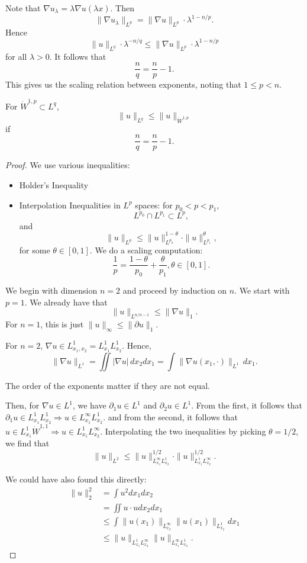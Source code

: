 \documentclass[12pt]{scrartcl}
\begin{document}
Note that $\nabla u_\lambda = \lambda \nabla u(\lambda x)$.  Then 
$$\|\nabla u_\lambda\|_{L^p} = \| \nabla u \|_{L^p} \cdot \lambda^{1 - n/p}.$$
Hence $$\|u\|_{L^q} \cdot \lambda^{-n/q} \le \|\nabla u\|_{L^p} \cdot \lambda^{1 - n/p}$$
for all $\lambda > 0$.  It follows that 
$$\frac{n}{q} = \frac{n}{p} - 1.$$
This gives us the scaling relation between exponents, noting that $1 \le p < n$.
\begin{thm}  For $\dot{W}^{1,p} \subset L^q$, 
$$\|u\|_{L^q} \le \| u \|_{\dot{W}^{1, p}}$$
if 
$$\frac{n}{q} = \frac{n}{p} - 1.$$
\end{thm}
\begin{proof}
We use various inequalities:
\begin{itemize}
\item Holder's Inequality
\item Interpolation Inequalities in $L^p$ spaces: for $p_0 < p < p_1$,
$$L^{p_0} \cap L^{p_1} \subset L^p,$$
and 
$$\|u\|_{L^p} \le \|u\|_{L^{p_0}} ^{1-\theta}\cdot \|u\|_{L^{p_1}}^\theta,$$
for some $\theta \in [0, 1]$.
We do a scaling computation:
$$\frac{1}{p} = \frac{1 - \theta}{p_0} + \frac{\theta}{p_1}, \theta \in [0, 1].$$
\end{itemize}
We begin with dimension $n = 2$ and proceed by induction on $n$.  We start with $p = 1$.  We already have that 
$$\|u\|_{L^{n/n-1}} \le \|\nabla u\|_{1}.$$
For $n = 1$, this is just $\|u\|_{\infty} \le \|\partial u\|_1$.

For $n = 2$, $\nabla u \in L_{x_1, x_2}^1 = L_{x_1}^1L_{x_2}^1$.  Hence,
$$\|\nabla u\|_{L^1} = \iint |\nabla u| \, dx_2 dx_1 = \int \|\nabla u(x_1, \cdot)\|_{L^1}\,dx_1.$$
\begin{remark}The order of the exponents matter if they are not equal.
\end{remark}
Then, for $\nabla u \in L^1$, we have $\partial_1 u \in L^1$ and $\partial_2 u \in L^1$.  
From the first, it follows that $\partial_1 u \in L_{x_1}^1 L_{x_2}^1 \Longrightarrow u \in L_{x_1}^{\infty}L_{x_2}^1$. and from the second, it follows that $u \in L_{x_1}^1 \dot{W}^{1, 1} \Longrightarrow u \in L_{x_1}^1 L_{x_2}^{\infty}$.  Interpolating the two inequalities by picking $\theta = 1/2$, we find that 
$$\|u\|_{L^2} \le \|u\|_{L_{x_1}^{\infty}L_{x_2}^1}^{1/2} \cdot \|u\|_{L_{x_1}^1 L_{x_2}^{\infty}}^{1/2}.$$

We could have also found this directly:
\begin{align*}
\|u\|_2^2 &= \int u^2 dx_1 dx_2 \\
&= \iint u \cdot u dx_2 dx_1 \\
&\le \int \|u(x_1)\|_{L_{x_2}^{\infty}} \|u(x_1)\|_{L_{x_2}^1} dx_1\\
&\le \|u\|_{L_{x_1}^1L_{x_2}^{\infty}}\|u\|_{L_{x_1}^{\infty}L_{x_2}^1}.
\end{align*}


\end{proof}
\end{document}
